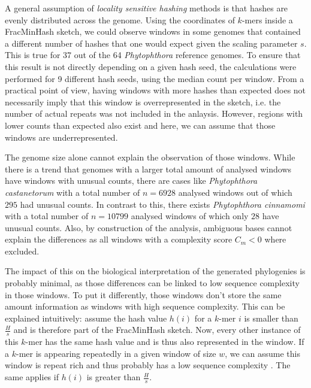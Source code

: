 A general assumption of \textit{locality sensitive hashing} methods is that
hashes are evenly distributed across the genome. Using the coordinates of
$k$-mers inside a FracMinHash sketch, we could observe windows in some genomes
that contained a different number of hashes that one would expect given the
scaling parameter $s$. This is true for 37 out of the 64 \textit{Phytophthora}
reference genomes. To ensure that this result is not directly depending on a
given hash seed, the calculations were performed for 9 different hash seeds,
using the median count per window. From a practical point of view, having
windows with more hashes than expected does not necessarily imply that this
window is overrepresented in the sketch, i.e. the number of actual repeats was
not included in the anlaysis. However, regions with lower counts than expected
also exist and here, we can assume that those windows are underrepresented.

The genome size alone cannot explain the observation of those windows. While
there is a trend that genomes with a larger total amount of analysed windows
have windows with unusual counts, there are cases like \textit{Phytophthora
castanetorum} with a total number of $n=6928$ analysed windows out of which
$295$ had unusual counts. In contrast to this, there exists \textit{Phytophthora
cinnamomi} with a total number of $n=10799$ analysed windows of which only $28$
have unusual counts. Also, by construction of the analysis, ambiguous bases
cannot explain the differences as all windows with a complexity score $C_m < 0$
where excluded. 

The impact of this on the biological interpretation of the generated phylogenies
is probably minimal, as those differences can be linked to low sequence
complexity in those windows. To put it differently, those windows don't store
the same amount information as windows with high sequence complexity. This can
be explained intuitively: assume the hash value $h(i)$ for a $k$-mer $i$ is
smaller than $\frac{H}{s}$ and is therefore part of the FracMinHash sketch. Now,
every other instance of this $k$-mer has the same hash value and is thus also
represented in the window. If a $k$-mer is appearing repeatedly in a given
window of size $w$, we can assume this window is repeat rich and thus probably
has a low sequence complexity \cite{pirogovHighcomplexityRegionsMammalian2019}.
The same applies if $h(i)$ is greater than $\frac{H}{s}$.

